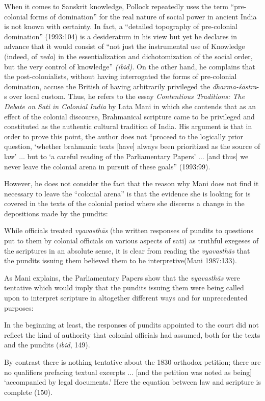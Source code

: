 When it comes to Sanskrit knowledge, Pollock repeatedly uses the term “pre-colonial forms of domination” for the real nature of social power in ancient India is not known with certainty. In fact, a “detailed topography of pre-colonial domination” (1993:104) is a desideratum in his view but yet he declares in advance that it would consist of “not just the instrumental use of Knowledge (indeed, of {\sl veda}) in the essentialization and dichotomization of the social order, but the very control of knowledge” {\sl (ibid)}. On the other hand, he complains that the post-colonialists, without having interrogated the forms of pre-colonial domination, accuse the British of having arbitrarily privileged the {\sl dharma-śāstra}-s over local custom. Thus, he refers to the essay {\sl Contentious Traditions: The Debate on Sati in Colonial India} by Lata Mani in which she contends that as an effect of the colonial discourse, Brahmanical scripture came to be privileged and constituted as the authentic cultural tradition of India. His argument is that in order to prove this point, the author does not “proceed to the logically prior question, ‘whether brahmanic texts [have] always been prioritized as the source of law’ $\ldots$ but to ‘a careful reading of the Parliamentary Papers’ $\ldots$ [and thus] we never leave the colonial arena in pursuit of these goals” (1993:99).

However, he does not consider the fact that the reason why Mani does not find it necessary to leave the “colonial arena” is that the evidence she is looking for is covered in the texts of the colonial period where she discerns a change in the depositions made by the pundits:
\begin{myquote}
While officials treated {\sl vyavasthās} (the written responses of pundits to questions put to them by colonial officials on various aspects of sati) as truthful exegeses of the scriptures in an absolute sense, it is clear from reading the {\sl vyavasthās} that the pundits issuing them believed them to be interpretive\hfill (Mani 1987:133).
\end{myquote}

As Mani explains, the Parliamentary Papers show that the {\sl vyavasthās} were tentative which would imply that the pundits issuing them were being called upon to interpret scripture in altogether different ways and for unprecedented purposes: 

\begin{myquote}
In the beginning at least, the responses of pundits appointed to the court did not reflect the kind of authority that colonial officials had assumed, both for the texts and the pundits ({\sl ibid}, 149). 

By contrast there is nothing tentative about the 1830 orthodox petition; there are no qualifiers prefacing textual excerpts $\ldots$ [and the petition was noted as being] ‘accompanied by legal documents.’ Here the equation between law and scripture is complete (150). 
\end{myquote}

